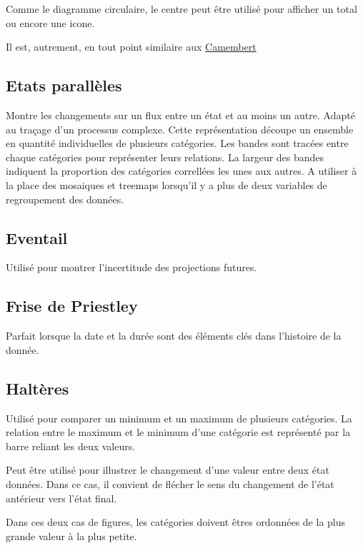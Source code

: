 \documentclass[a4paper,12pt]{article}
\begin{document}
\begin{multicols}{2}
Comme le diagramme circulaire, le centre peut être utilisé pour afficher un total ou encore une icone. \autocite{alansmithLexiqueVisuel}

Il est, autrement, en tout point similaire aux \hyperref[sec:orge23c2fb]{Camembert}
\subsection*{Etats parallèles}
\label{sec:org3ebdb10}
Montre les changements sur un flux entre un état et au moins un autre. Adapté au traçage d'un processus complexe. \autocite{alansmithLexiqueVisuel}
Cette représentation découpe un ensemble en quantité individuelles de plusieurs catégories. Les bandes sont tracées entre chaque catégories pour représenter leurs relations. La largeur des bandes indiquent la proportion des catégories correllées les unes aux autres. \autocite{wilkeVisualizingNestedProportions2019}
A utiliser à la place des mosaiques et treemaps lorsqu'il y a plus de deux variables de regroupement des données. \autocite{wilkeDirectoryVisualizations2019}
\subsection*{Eventail}
\label{sec:org5286012}
Utilisé pour montrer l'incertitude des projections futures. \autocite{alansmithLexiqueVisuel}
\subsection*{Frise de Priestley}
\label{sec:orga803418}
Parfait lorsque la date et la durée sont des éléments clés dans l'histoire de la donnée. \autocite{alansmithLexiqueVisuel}
\subsection*{Haltères}
\label{sec:org90b6aa7}
Utilisé pour comparer un minimum et un maximum de plusieurs catégories. \autocite{alansmithLexiqueVisuel} La relation entre le maximum et le minimum d'une catégorie est représenté par la barre reliant les deux valeurs. \autocite{mikeyiHowChooseRight2020}

Peut être utilisé pour illustrer le changement d'une valeur entre deux état données. Dans ce cas, il convient de flécher le sens du changement de l'état antérieur vers l'état final.

Dans ces deux cas de figures, les catégories doivent êtres ordonnées de la plus grande valeur à la plus petite.


\end{multicols}
\end{document}
